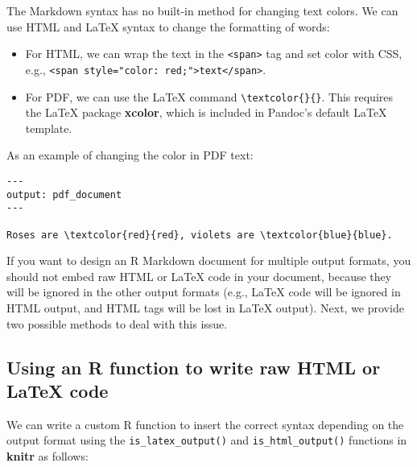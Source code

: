 \documentclass[
  11pt,
]{krantz}
\newenvironment{Shaded}{\begin{snugshade}}{\end{snugshade}}
\newcommand{\CharTok}[1]{\textcolor[rgb]{0.5,0.5,0.5}{#1}}
\newcommand{\ControlFlowTok}[1]{\textcolor[rgb]{0.27,0.27,0.27}{\textbf{#1}}}
\newcommand{\KeywordTok}[1]{\textcolor[rgb]{0.27,0.27,0.27}{\textbf{#1}}}
\newcommand{\NormalTok}[1]{#1}
\newcommand{\OperatorTok}[1]{\textcolor[rgb]{0.43,0.43,0.43}{\textbf{#1}}}
\newcommand{\StringTok}[1]{\textcolor[rgb]{0.5,0.5,0.5}{#1}}
\begin{document}
The Markdown syntax has no built-in method for changing text colors. We can use HTML and LaTeX syntax to change the formatting of words:

\begin{itemize}
\item
  For HTML, we can wrap the text in the \texttt{\textless{}span\textgreater{}} tag and set color with CSS, e.g., \texttt{\textless{}span\ style="color:\ red;"\textgreater{}text\textless{}/span\textgreater{}}.
\item
  For PDF, we can use the LaTeX command \texttt{\textbackslash{}textcolor\{\}\{\}}. This requires the LaTeX package \textbf{xcolor}, which is included in Pandoc's default LaTeX template.
\end{itemize}

As an example of changing the color in PDF text:

\begin{verbatim}
---
output: pdf_document
---

Roses are \textcolor{red}{red}, violets are \textcolor{blue}{blue}.
\end{verbatim}

If you want to design an R Markdown document for multiple output formats, you should not embed raw HTML or LaTeX code in your document, because they will be ignored in the other output formats (e.g., LaTeX code will be ignored in HTML output, and HTML tags will be lost in LaTeX output). Next, we provide two possible methods to deal with this issue.

\hypertarget{using-an-r-function-to-write-raw-html-or-latex-code}{%
\subsection{Using an R function to write raw HTML or LaTeX code}\label{using-an-r-function-to-write-raw-html-or-latex-code}}

We can write a custom R function to insert the correct syntax depending on the output format using the \texttt{is\_latex\_output()} and \texttt{is\_html\_output()} functions in \textbf{knitr} as follows:

\begin{Shaded}
\end{Shaded}
\end{document}
